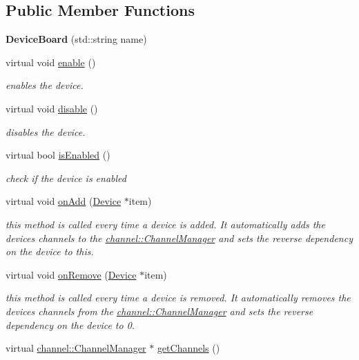 \subsection*{Public Member Functions}
\begin{DoxyCompactItemize}
\item 
\hypertarget{classdrobot_1_1device_1_1DeviceBoard_a09e11fda1665667f2f765a6f1acaaecb}{{\bfseries Device\-Board} (std\-::string name)}\label{classdrobot_1_1device_1_1DeviceBoard_a09e11fda1665667f2f765a6f1acaaecb}

\item 
virtual void \hyperlink{classdrobot_1_1device_1_1DeviceBoard_a1a01810b04372666baaafaf812e5a54e}{enable} ()
\begin{DoxyCompactList}\small\item\em enables the device. \end{DoxyCompactList}\item 
virtual void \hyperlink{classdrobot_1_1device_1_1DeviceBoard_a65eb028173bd7308192f1781d18f292d}{disable} ()
\begin{DoxyCompactList}\small\item\em disables the device. \end{DoxyCompactList}\item 
virtual bool \hyperlink{classdrobot_1_1device_1_1DeviceBoard_a23bae9f0c7f099bbb5f0c696ff5c126a}{is\-Enabled} ()
\begin{DoxyCompactList}\small\item\em check if the device is enabled \end{DoxyCompactList}\item 
virtual void \hyperlink{classdrobot_1_1device_1_1DeviceBoard_a51c658f37640d901e2ecaf6a612eaa15}{on\-Add} (\hyperlink{classdrobot_1_1device_1_1Device}{Device} $\ast$item)
\begin{DoxyCompactList}\small\item\em this method is called every time a device is added. It automatically adds the devices channels to the \hyperlink{classdrobot_1_1device_1_1channel_1_1ChannelManager}{channel\-::\-Channel\-Manager} and sets the reverse dependency on the device to this. \end{DoxyCompactList}\item 
virtual void \hyperlink{classdrobot_1_1device_1_1DeviceBoard_ab42d2d02abc3593960a9d6c18facf36e}{on\-Remove} (\hyperlink{classdrobot_1_1device_1_1Device}{Device} $\ast$item)
\begin{DoxyCompactList}\small\item\em this method is called every time a device is removed. It automatically removes the devices channels from the \hyperlink{classdrobot_1_1device_1_1channel_1_1ChannelManager}{channel\-::\-Channel\-Manager} and sets the reverse dependency on the device to 0. \end{DoxyCompactList}\item 
virtual \hyperlink{classdrobot_1_1device_1_1channel_1_1ChannelManager}{channel\-::\-Channel\-Manager} $\ast$ \hyperlink{classdrobot_1_1device_1_1DeviceBoard_ad62ff708f54468e97d2ba46c96b67960}{get\-Channels} ()
\end{DoxyCompactItemize}
